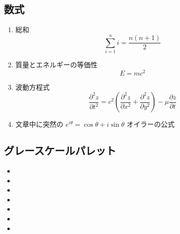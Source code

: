 \clearpage
\subsection{数式}
\begin{enumerate}

\item 総和
\begin{equation}
\sum_{i=1}^n i = \frac{n(n+1)}{2}
\end{equation}

\item 質量とエネルギーの等価性
\begin{equation}
E = mc ^2
\end{equation}

\item 波動方程式
\begin{equation}
\frac{\partial^2 z}{\partial t^2}=
c^2 (\frac{\partial^2 z}{\partial x^2}+\frac{\partial^2 z}{\partial y^2})-
\mu \frac{\partial z}{\partial t}
\end{equation}

\item 文章中に突然の $e^{i\theta}=\cos\theta+i\sin\theta$ オイラーの公式

\end{enumerate}

\subsection{グレースケールパレット}

\begin{itemize}

\tt\Large
\item{}
\item{}
\item{}
\item{}
\item{}
\item{}
\item{}

\end{itemize}
